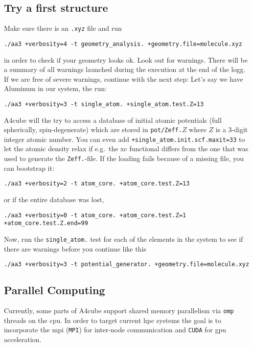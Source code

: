 \documentclass[oribibl]{llncs}
\newcommand{\ttt}[1]{\texttt{#1}}
\newcommand{\codename}{A4cube}
\begin{document}
\subsection{Try a first structure}
Make sure there is an \ttt{.xyz} file and run
\begin{verbatim}
./aa3 +verbosity=4 -t geometry_analysis. +geometry.file=molecule.xyz
\end{verbatim}
in order to check if your geometry looks ok. Look out for warnings.
There will be a summary of all warnings launched during the execution at the end of the logg.
If we are free of severe warnings, continue with the next step:
Let's say we have Aluminum in our system, the run:
\begin{verbatim}
./aa3 +verbosity=3 -t single_atom. +single_atom.test.Z=13
\end{verbatim}

\codename{} will the try to access a database of initial atomic potentials
(full spherically, spin-degenerate) which are stored in \ttt{pot/Zeff.}$Z$
where $Z$ is a 3-digit integer atomic number.
You can even add \ttt{+single\_atom.init.scf.maxit=33} to let the atomic density relax if e.g.~the \ac{xc} functional differs from the one that was used to generate the \ttt{Zeff.}-file.
If the loading fails because of a missing file, you can bootstrap it:
\begin{verbatim}
./aa3 +verbosity=2 -t atom_core. +atom_core.test.Z=13
\end{verbatim}
or if the entire database was lost,
\begin{verbatim}
./aa3 +verbosity=0 -t atom_core. +atom_core.test.Z=1 +atom_core.test.Z.end=99
\end{verbatim}

Now, run the \ttt{single\_atom.} test for each of the elements in the system to see if there are warnings before you continue like this
\begin{verbatim}
./aa3 +verbosity=3 -t potential_generator. +geometry.file=molecule.xyz
\end{verbatim}

\subsection{Parallel Computing}
Currently, some parts of \codename{} support shared memory parallelism 
via \ttt{omp} threads on the \ac{cpu}.
In order to target current \ac{hpc} systems 
the goal is to incorporate the \ac{mpi} (\ttt{MPI}) 
for inter-node communication 
and \ttt{CUDA} for \ac{gpu} acceleration.
\end{document}
